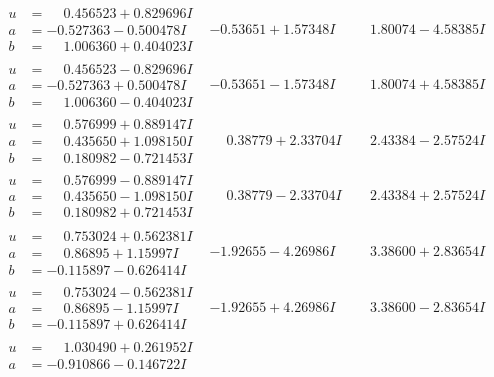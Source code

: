 \documentclass[1p]{elsarticle_modified}
\theoremstyle{definition}
\begin{document}
$$\begin{array}{c|c|c}
\begin{aligned}
u &= \phantom{-}0.456523 + 0.829696 I \\
a &= -0.527363 - 0.500478 I \\
b &= \phantom{-}1.006360 + 0.404023 I\end{aligned}
 & -0.53651 + 1.57348 I & \phantom{-}1.80074 - 4.58385 I \\ \hline\begin{aligned}
u &= \phantom{-}0.456523 - 0.829696 I \\
a &= -0.527363 + 0.500478 I \\
b &= \phantom{-}1.006360 - 0.404023 I\end{aligned}
 & -0.53651 - 1.57348 I & \phantom{-}1.80074 + 4.58385 I \\ \hline\begin{aligned}
u &= \phantom{-}0.576999 + 0.889147 I \\
a &= \phantom{-}0.435650 + 1.098150 I \\
b &= \phantom{-}0.180982 - 0.721453 I\end{aligned}
 & \phantom{-}0.38779 + 2.33704 I & \phantom{-}2.43384 - 2.57524 I \\ \hline\begin{aligned}
u &= \phantom{-}0.576999 - 0.889147 I \\
a &= \phantom{-}0.435650 - 1.098150 I \\
b &= \phantom{-}0.180982 + 0.721453 I\end{aligned}
 & \phantom{-}0.38779 - 2.33704 I & \phantom{-}2.43384 + 2.57524 I \\ \hline\begin{aligned}
u &= \phantom{-}0.753024 + 0.562381 I \\
a &= \phantom{-}0.86895 + 1.15997 I \\
b &= -0.115897 - 0.626414 I\end{aligned}
 & -1.92655 - 4.26986 I & \phantom{-}3.38600 + 2.83654 I \\ \hline\begin{aligned}
u &= \phantom{-}0.753024 - 0.562381 I \\
a &= \phantom{-}0.86895 - 1.15997 I \\
b &= -0.115897 + 0.626414 I\end{aligned}
 & -1.92655 + 4.26986 I & \phantom{-}3.38600 - 2.83654 I \\ \hline\begin{aligned}
u &= \phantom{-}1.030490 + 0.261952 I \\
a &= -0.910866 - 0.146722 I \\

\end{aligned}
\end{array}$$
\end{document}
